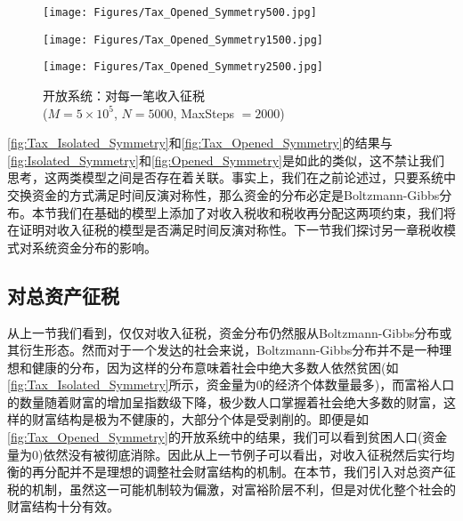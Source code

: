 \documentclass[tsinghuacite]{HustGraduPaper}
\begin{document}
		\begin{figure}[htbp]
			\centering                                                 
			\begin{minipage}[t]{0.49\textwidth}                                                      
			\texttt{[image: Figures/Tax\_Opened\_Symmetry500.jpg]}               
			\end{minipage}
			\begin{minipage}[t]{0.49\textwidth}                 
			\texttt{[image: Figures/Tax\_Opened\_Symmetry1500.jpg]}               
			\end{minipage}
			
			\begin{minipage}[t]{0.49\textwidth}                 
			\texttt{[image: Figures/Tax\_Opened\_Symmetry2500.jpg]}               
			\end{minipage}

			\caption{开放系统：对每一笔收入征税 \\ ($M = 5 \times 10^5$, $N = 5000$, MaxSteps $= 2000$)} 
			\label{fig:Tax_Opened_Symmetry}                                                        
		\end{figure}
		
		
		\autoref{fig:Tax_Isolated_Symmetry}和\autoref{fig:Tax_Opened_Symmetry}的结果与\autoref{fig:Isolated_Symmetry}和\autoref{fig:Opened_Symmetry}是如此的类似，这不禁让我们思考，这两类模型之间是否存在着关联。事实上，我们在之前论述过，只要系统中交换资金的方式满足时间反演对称性，那么资金的分布必定是Boltzmann-Gibbs分布。本节我们在基础的模型上添加了对收入税收和税收再分配这两项约束，我们将\label{subsec:tax_time_symmetry}在证明对收入征税的模型是否满足时间反演对称性。下一节我们探讨另一章税收模式对系统资金分布的影响。

		
	
		\subsection{对总资产征税}
			
		从上一节我们看到，仅仅对收入征税，资金分布仍然服从Boltzmann-Gibbs分布或其衍生形态。然而对于一个发达的社会来说，Boltzmann-Gibbs分布并不是一种理想和健康的分布，因为这样的分布意味着社会中绝大多数人依然贫困(如\autoref{fig:Tax_Isolated_Symmetry}所示，资金量为$0$的经济个体数量最多)，而富裕人口的数量随着财富的增加呈指数级下降，极少数人口掌握着社会绝大多数的财富，这样的财富结构是极为不健康的，大部分个体是受剥削的。即便是如\autoref{fig:Tax_Opened_Symmetry}的开放系统中的结果，我们可以看到贫困人口(资金量为$0$)依然没有被彻底消除。因此从上一节例子可以看出，对收入征税然后实行均衡的再分配并不是理想的调整社会财富结构的机制。在本节，我们引入对总资产征税的机制，虽然这一可能机制较为偏激，对富裕阶层不利，但是对优化整个社会的财富结构十分有效。
		
\end{document}
